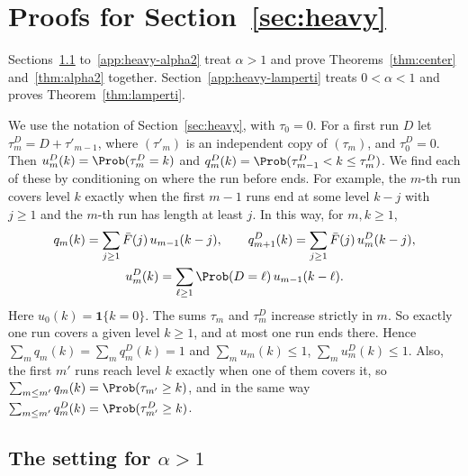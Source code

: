 \section{Proofs for Section~\ref{sec:heavy}}\label{app:heavy}

Sections~\ref{app:heavy-setting} to~\ref{app:heavy-alpha2} treat $\alpha>1$ and prove
Theorems~\ref{thm:center} and~\ref{thm:alpha2} together.
Section~\ref{app:heavy-lamperti} treats $0<\alpha<1$ and proves
Theorem~\ref{thm:lamperti}.

We use the notation of Section~\ref{sec:heavy}, with $\tau_0=0$. For a first run $D$ let
$\tau^D_m=D+\tau'_{m-1}$, where $(\tau'_m)$ is an independent copy of $(\tau_m)$, and
$\tau^D_0=0$. Then $u^D_m(k)=\Prob(\tau^D_m=k)$ and
$q^D_m(k)=\Prob(\tau^D_{m-1}<k\le\tau^D_m)$. We find each of these by conditioning on
where the run before ends. For example, the $m$-th run covers level $k$ exactly when the
first $m-1$ runs end at some level $k-j$ with $j\ge1$ and the $m$-th run has length at
least $j$. In this way, for $m,k\ge1$,
\begin{equation}\label{eq:C-conv}
\begin{gathered}
q_m(k)=\sum_{j\ge1}\bar F(j)\,u_{m-1}(k-j),\qquad
q^D_{m+1}(k)=\sum_{j\ge1}\bar F(j)\,u^D_m(k-j),\\
u^D_m(k)=\sum_{\ell\ge1}\Prob(D=\ell)\,u_{m-1}(k-\ell).
\end{gathered}
\end{equation}
Here $u_0(k)=\mathbf 1\{k=0\}$. The sums $\tau_m$ and $\tau^D_m$ increase strictly in $m$.
So exactly one run covers a given level $k\ge1$, and at most one run ends there. Hence
$\sum_mq_m(k)=\sum_mq^D_m(k)=1$ and $\sum_mu_m(k)\le1$, $\sum_mu^D_m(k)\le1$. Also, the
first $m'$ runs reach level $k$ exactly when one of them covers it, so
$\sum_{m\le m'}q_m(k)=\Prob(\tau_{m'}\ge k)$, and in the same way
$\sum_{m\le m'}q^D_m(k)=\Prob(\tau^D_{m'}\ge k)$.

\subsection{The setting for \texorpdfstring{$\alpha>1$}{alpha > 1}}\label{app:heavy-setting}

